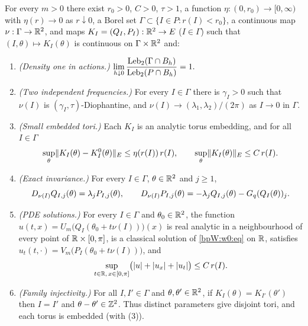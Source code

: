 \begin{theorem}\label{bpW:wh:nlw2}
For every $m>0$ there exist $r_0>0$, $C>0$, $\tau>1$, a function $\eta:(0,r_0)\to[0,\infty)$ with
$\eta(r)\to0$ as $r\downarrow0$, a Borel set $\Gamma\subset\{I\in P:r(I)<r_0\}$, a continuous map
$\nu:\Gamma\to\mathbb{R}^2$, and maps $K_I=(Q_I,P_I):\mathbb{R}^2\to E$ ($I\in\Gamma$) such that $(I,\theta)\mapsto K_I(\theta)$ is
continuous on $\Gamma\times\mathbb{R}^2$ and:
\begin{enumerate}[label=(\arabic*)]
\item \emph{(Density one in actions.)}
  $\displaystyle\lim_{h\downarrow0}\frac{\operatorname{Leb}_2(\Gamma\cap B_h)}{\operatorname{Leb}_2(P\cap B_h)}=1.$
\item \emph{(Two independent frequencies.)} For every $I\in\Gamma$ there is $\gamma_I>0$ such that $\nu(I)$ is
  $(\gamma_I,\tau)$-Diophantine, and $\nu(I)\to(\lambda_1,\lambda_2)/(2\pi)$ as $I\to0$ in $\Gamma$.
\item \emph{(Small embedded tori.)} Each $K_I$ is an analytic torus embedding, and for all $I\in\Gamma$
  \[\sup_\theta\lVert K_I(\theta)-K^0_I(\theta)\rVert_E\le\eta(r(I))\,r(I),\qquad\sup_\theta\lVert K_I(\theta)\rVert_E\le C\,r(I).\]
\item \emph{(Exact invariance.)} For every $I\in\Gamma$, $\theta\in\mathbb{R}^2$ and $j\ge1$,
  \[D_{\nu(I)}Q_{I,j}(\theta)=\lambda_jP_{I,j}(\theta),\qquad
  D_{\nu(I)}P_{I,j}(\theta)=-\lambda_jQ_{I,j}(\theta)-G_q(Q_I(\theta))_j.\]
\item \emph{(PDE solutions.)} For every $I\in\Gamma$ and $\theta_0\in\mathbb{R}^2$, the function
  $u(t,x)=U_m\bigl(Q_I(\theta_0+t\nu(I))\bigr)(x)$ is real analytic in a neighbourhood of every point of
  $\mathbb{R}\times[0,\pi]$, is a classical solution of \eqref{bpW:w0:eq} on $\mathbb{R}$, satisfies
  $u_t(t,\cdot)=V_m\bigl(P_I(\theta_0+t\nu(I))\bigr)$, and
  \[\sup_{t\in\mathbb{R},\,x\in[0,\pi]}\bigl(\lvert u\rvert+\lvert u_x\rvert+\lvert u_t\rvert\bigr)\le C\,r(I).\]
\item \emph{(Family injectivity.)} For all $I,I'\in\Gamma$ and $\theta,\theta'\in\mathbb{R}^2$, if
  $K_I(\theta)=K_{I'}(\theta')$ then $I=I'$ and $\theta-\theta'\in\mathbb{Z}^2$. Thus distinct parameters give disjoint
  tori, and each torus is embedded (with (3)).
\end{enumerate}
\end{theorem}

